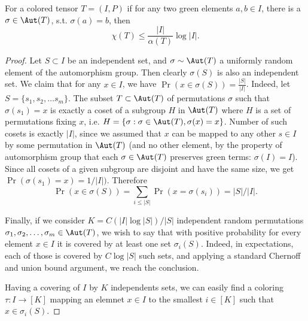 \begin{lemma}
\label{lem:coloring-from-symmetry}
For a colored tensor $T = (I, P)$ if for any two green elements $a,b \in I$, there is a $\sigma \in \Aut(T)$, s.t. $\sigma(a) = b$, then 
\begin{equation*}
    \chi(T) \leq \frac{|I|}{\alpha(T)} \log |I|.
\end{equation*}
\end{lemma}
\begin{proof}
Let $S \subset I$ be an independent set, and $\sigma \sim \Aut(T)$ a uniformly random element of the automorphism group. Then clearly $\sigma(S)$ is also an independent set. We claim that for any $x \in I$, we have $\Pr(x \in \sigma(S)) = \frac{|S|}{|I|}$. Indeed, let $S = \{ s_1, s_2, \ldots s_m \}$. The subset $T \subset \Aut(T)$ of permutations $\sigma$ such that $\sigma(s_1) = x$ is exactly a coset of a subgroup $H$ in $\Aut(T)$ where $H$ is a set of permutations fixing $x$, i.e. $H = \{ \sigma : \sigma \in \Aut(T), \sigma(x) = x \}$. Number of such cosets is exactly $|I|$, since we assumed that $x$ can be mapped to any other $s \in I$ by some permutation in $\Aut(T)$ (and no other element, by the property of automorphism group that each $\sigma \in \Aut(T)$ preserves green terms: $\sigma(I) = I$). Since all cosets of a given subgroup are disjoint and have the same size, we get $\Pr(\sigma(s_1) = x) = 1/|I|)$. Therefore
\begin{equation*}
    \Pr(x \in \sigma(S)) = \sum_{i \leq |S|} \Pr(x = \sigma(s_i)) = |S|/|I|.
\end{equation*}

Finally, if we consider $K = C (|I| \log |S|) / |S|$ independent random permutations $\sigma_1, \sigma_2, \ldots, \sigma_m \in \Aut(T)$, we wish to say that with positive probability for every element $x \in I$ it is covered by at least one set $\sigma_i(S)$. Indeed, in expectations, each of those is covered by $C \log |S|$ such sets, and applying a standard Chernoff and union bound argument, we reach the conclusion. 

Having a covering of $I$ by $K$ independents sets, we can easily find a coloring $\tau : I \to [K]$ mapping an elemnet $x \in I$ to the smallest $i \in [K]$ such that $x \in \sigma_i(S)$.
\end{proof}

